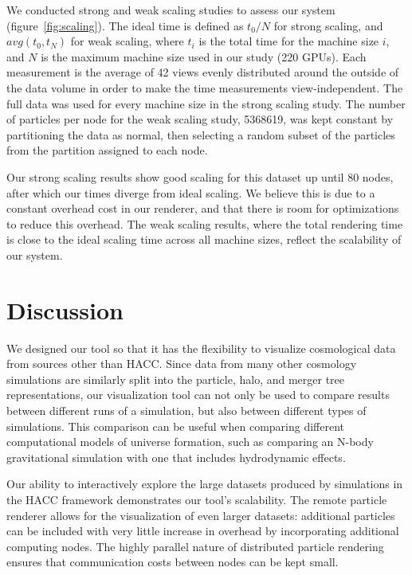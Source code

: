 We conducted strong and weak scaling studies to assess our system (figure~\ref{fig:scaling}). The ideal time is defined as $t_0 / N$ for strong scaling, and $avg(t_0, t_N)$ for weak scaling, where $t_i$ is the total time for the machine size $i$, and $N$ is the maximum machine size used in our study (220 GPUs). Each measurement is the average of 42 views evenly distributed around the outside of the data volume in order to make the time measurements view-independent. The full data was used for every machine size in the strong scaling study. The number of particles per node for the weak scaling study, 5368619, was kept constant by partitioning the data as normal, then selecting a random subset of the particles from the partition assigned to each node.

Our strong scaling results show good scaling for this dataset up until 80 nodes, after which our times diverge from ideal scaling. We believe this is due to a constant overhead cost in our renderer, and that there is room for optimizations to reduce this overhead. The weak scaling results, where the total rendering time is close to the ideal scaling time across all machine sizes, reflect the scalability of our system.

\section{Discussion}
We designed our tool so that it has the flexibility to visualize cosmological data from sources other than HACC. Since data from many other cosmology simulations are similarly split into the particle, halo, and merger tree representations, our visualization tool can not only be used to compare results between different runs of a simulation, but also between different types of simulations. This comparison can be useful when comparing different computational models of universe formation, such as comparing an N-body gravitational simulation with one that includes hydrodynamic effects.

Our ability to interactively explore the large datasets produced by simulations in the HACC framework demonstrates our tool's scalability. The remote particle renderer allows for the visualization of even larger datasets: additional particles can be included with very little increase in overhead by incorporating additional computing nodes. The highly parallel nature of distributed particle rendering ensures that communication costs between nodes can be kept small.

